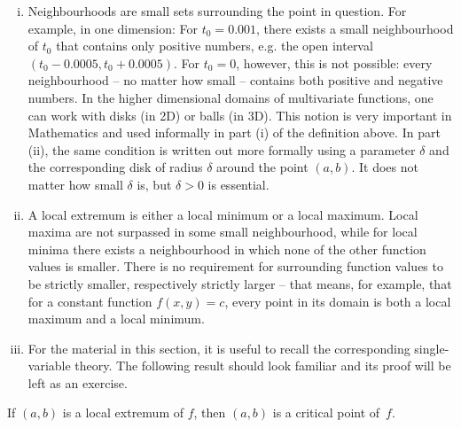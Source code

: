 \begin{remark}
\begin{enumerate}[(i)]
	\item Neighbourhoods are small sets surrounding the point in question. For example, in one dimension: For $t_0 = 0.001$, there exists a small neighbourhood of $t_0$ that contains only positive numbers, e.g. the open interval $(t_0-0.0005,t_0+0.0005)$. For $t_0=0$, however, this is not possible: every neighbourhood -- no matter how small -- contains both positive and negative numbers. In the higher dimensional domains of multivariate functions, one can work with disks (in 2D) or balls (in 3D). This notion is very important in Mathematics and used informally in part (i) of the definition above. In part (ii), the same condition is written out more formally using a parameter $\delta$ and the corresponding disk of radius $\delta$ around the point $(a,b)$. It does not matter how small $\delta$ is, but $\delta>0$ is essential.
	\item A local extremum is either a local minimum or a local maximum. Local maxima are not surpassed in some small neighbourhood, while for local minima there exists a neighbourhood in which none of the other function values is smaller. There is no requirement for surrounding function values to be strictly smaller, respectively strictly larger -- that means, for example, that for a constant function $f(x,y)=c$, every point in its domain is both a local maximum and a local minimum.
	\item For the material in this section, it is useful to recall the corresponding single-variable theory. The following result should look familiar and its proof will be left as an exercise.
\end{enumerate}
\end{remark}

\begin{theorem}
\label{thm:crit_pts}
If $(a,b)$ is a local extremum of $f$, then $(a,b)$ is a critical point of~$f$.
\end{theorem}

